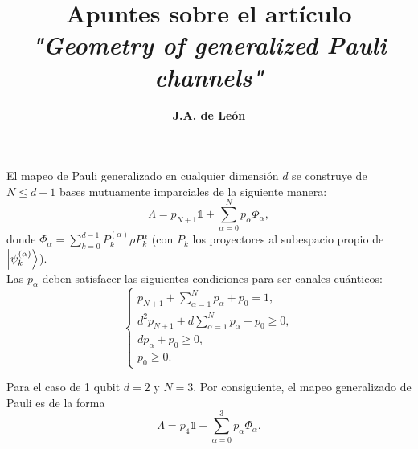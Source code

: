 \documentclass[11pt,letterpaper]{article}
\author{\textbf{J.A. de León}}
\title{\Large Apuntes sobre el artículo \\ \emph{"Geometry of generalized Pauli channels" \cite{siudzinska2020geometry}}}
\date{}
\begin{document}
\maketitle

El mapeo de Pauli generalizado en cualquier dimensión $d$ se construye de $N\leq d+1$ bases mutuamente imparciales de la siguiente manera: 
\begin{equation}
	\Lambda = p_{N+1}\mathbb{1}	 + \sum _{\alpha = 0}^{N}p_{\alpha} \Phi _{\alpha},
	\label{eq:Lambda}
\end{equation}
donde $\Phi_{\alpha}=\sum _{k=0}^{d-1}P_k^{(\alpha)}\rho P_k^{\alpha}$ (con $P_k$ los proyectores al subespacio propio de $\ket{\psi _k^{(\alpha)}}$).\\


Las $p_{\alpha}$ deben satisfacer las siguientes condiciones para ser canales cuánticos:
\begin{equation}
	\begin{cases}
	p_{N+1} + \sum _{\alpha=1}^{N}p_{\alpha} + p_0 = 1,\\
	d^2p_{N+1} + d\sum _{\alpha=1}^{N}p_{\alpha} + p_0 \geq 0,\\
	dp_{\alpha} + p_0 \geq 0,\\
	p_0 \geq 0.
	\end{cases}
	\label{eq:p_conditions}
\end{equation}

Para el caso de 1 qubit $d=2$ y $N=3$. Por consiguiente, el mapeo generalizado de Pauli es de la forma
\begin{equation}
	\Lambda = p_{4}\mathbb{1}	 + \sum _{\alpha = 0}^{3}p_{\alpha} \Phi _{\alpha}.
	\label{eq:Lambda_1qubit}
\end{equation} 
\end{document}
